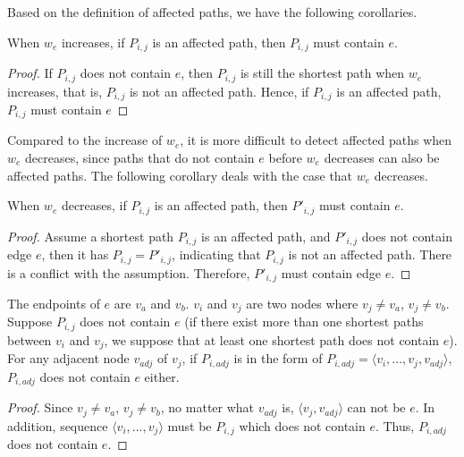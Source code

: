 Based on the definition of affected paths, we have the following corollaries.

\begin{corollary}
\label{corollary:weight-increase}
When $w_e$ increases, if $P_{i,j}$ is an affected path, then $P_{i,j}$ must contain $e$.
\end{corollary}

\begin{proof}
If $P_{i,j}$ does not contain $e$, then $P_{i,j}$ is still the shortest path when $w_e$ increases, that is, $P_{i,j}$ is not an affected path. Hence, if $P_{i,j}$ is an affected path, $P_{i,j}$ must contain $e$
\end{proof}

Compared to the increase of $w_e$, it is more difficult to detect affected paths when $w_e$ decreases, since paths that do not contain $e$ before $w_e$ decreases can also be affected paths.
The following corollary deals with the case that $w_e$ decreases.

\begin{corollary}
\label{corollary:weight-decrease}
When $w_e$ decreases, if $P_{i,j}$ is an affected path, then $P'_{i,j}$ must contain $e$.
\end{corollary}
\begin{proof}
Assume a shortest path $P_{i,j}$ is an affected path, and $P'_{i,j}$ does not contain edge $e$, then it has $P_{i,j}=P'_{i,j}$, indicating that $P_{i,j}$ is not an affected path. There is a conflict with the assumption. Therefore, $P'_{i,j}$ must contain edge $e$.
\end{proof}

\begin{corollary}
\label{thm:node-node}
The endpoints of $e$ are $v_a$ and $v_b$. $v_i$ and $v_j$ are two nodes where $v_j\neq v_a$, $v_j\neq v_b$. Suppose $P_{i,j}$ does not contain $e$ (if there exist more than one shortest paths between $v_i$ and $v_j$, we suppose that at least one shortest path does not contain $e$).
For any adjacent node $v_{adj}$ of $v_j$, if $P_{i,adj}$ is in the form of $P_{i,adj}=\langle v_i,...,v_j,v_{adj}\rangle$, $P_{i,adj}$ does not contain $e$ either.
\end{corollary}


\begin{proof}
Since $v_j\neq v_a$, $v_j\neq v_b$, no matter what $v_{adj}$ is, $\langle v_j,v_{adj} \rangle$ can not be $e$. In addition, sequence $\langle v_i,...,v_j\rangle$ must be $P_{i,j}$ which does not contain $e$. Thus, $P_{i,{adj}}$ does not contain $e$.
\end{proof}

